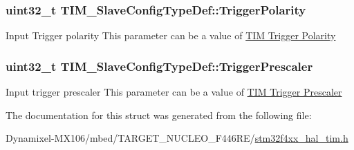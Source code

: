 \subsubsection[{\texorpdfstring{Trigger\+Polarity}{TriggerPolarity}}]{\setlength{\rightskip}{0pt plus 5cm}uint32\+\_\+t T\+I\+M\+\_\+\+Slave\+Config\+Type\+Def\+::\+Trigger\+Polarity}\hypertarget{struct_t_i_m___slave_config_type_def_afa8fa1801ef5e13115732a495ef11165}{}\label{struct_t_i_m___slave_config_type_def_afa8fa1801ef5e13115732a495ef11165}
Input Trigger polarity This parameter can be a value of \hyperlink{group___t_i_m___trigger___polarity}{T\+IM Trigger Polarity} 
\subsubsection[{\texorpdfstring{Trigger\+Prescaler}{TriggerPrescaler}}]{\setlength{\rightskip}{0pt plus 5cm}uint32\+\_\+t T\+I\+M\+\_\+\+Slave\+Config\+Type\+Def\+::\+Trigger\+Prescaler}\hypertarget{struct_t_i_m___slave_config_type_def_a57be6d41d77a968f1daeac7b65b1ab4c}{}\label{struct_t_i_m___slave_config_type_def_a57be6d41d77a968f1daeac7b65b1ab4c}
Input trigger prescaler This parameter can be a value of \hyperlink{group___t_i_m___trigger___prescaler}{T\+IM Trigger Prescaler} 

The documentation for this struct was generated from the following file\+:\begin{DoxyCompactItemize}
\item 
Dynamixel-\/\+M\+X106/mbed/\+T\+A\+R\+G\+E\+T\+\_\+\+N\+U\+C\+L\+E\+O\+\_\+\+F446\+R\+E/\hyperlink{stm32f4xx__hal__tim_8h}{stm32f4xx\+\_\+hal\+\_\+tim.\+h}\end{DoxyCompactItemize}
